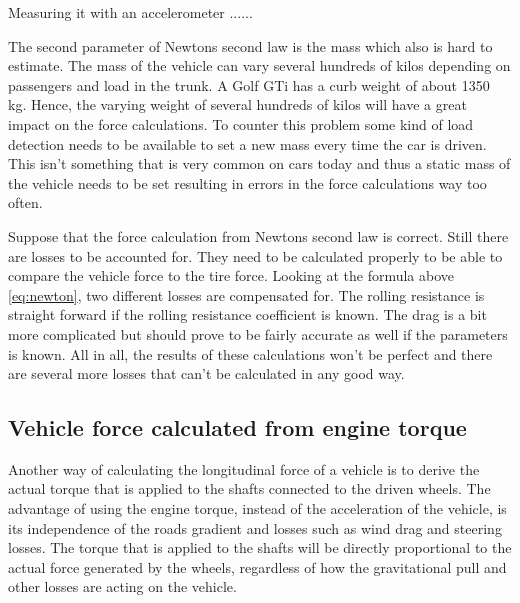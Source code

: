 Measuring it with an accelerometer ......

The second parameter of Newtons second law is the mass which also is hard to estimate. The mass of the vehicle can vary several hundreds of kilos depending on passengers and load in the trunk. A Golf GTi has a curb weight of about 1350 kg. Hence, the varying weight of several hundreds of kilos will have a great impact on the force calculations. To counter this problem some kind of load detection needs to be available to set a new mass every time the car is driven. This isn't something that is very common on cars today and thus a static mass of the vehicle needs to be set resulting in errors in the force calculations way too often.

Suppose that the force calculation from Newtons second law is correct. Still there are losses to be accounted for. They need to be calculated properly to be able to compare the vehicle force to the tire force. Looking at the formula above \ref{eq:newton}, two different losses are compensated for. The rolling resistance is straight forward if the rolling resistance coefficient is known. The drag is a bit more complicated but should prove to be fairly accurate as well if the parameters is known. All in all, the results of these calculations won't be perfect and there are several more losses that can't be calculated in any good way. 


\subsection{Vehicle force calculated from engine torque}
Another way of calculating the longitudinal force of a vehicle is to derive the actual torque that is applied to the shafts connected to the driven wheels. The advantage of using the engine torque, instead of the acceleration of the vehicle, is its independence of the roads gradient and losses such as wind drag and steering losses. The torque that is applied to the shafts will be directly proportional to the actual force generated by the wheels, regardless of how the gravitational pull and other losses are acting on the vehicle. 

